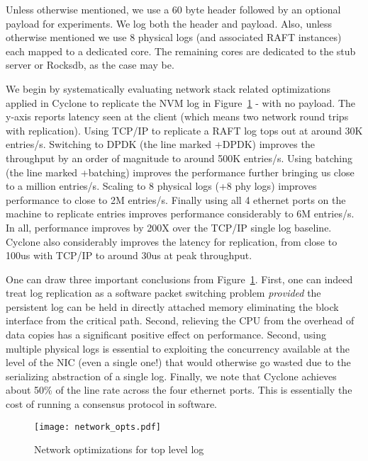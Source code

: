 \documentclass[twocolumn]{article}
\begin{document}
Unless otherwise mentioned, we use a 60 byte header followed by an optional
payload for experiments. We log both the header and payload. Also, unless
otherwise mentioned we use 8 physical logs (and associated RAFT instances) each
mapped to a dedicated core. The remaining cores are dedicated to the stub
server or Rocksdb, as the case may be.

We begin by systematically evaluating network stack related optimizations
applied in Cyclone to replicate the NVM log in Figure~\ref{fig:network_opts} -
with no payload. The y-axis reports latency seen at the client (which means two
network round trips with replication). Using TCP/IP to replicate a RAFT log tops
out at around 30K entries/s.  Switching to DPDK (the line marked +DPDK) improves
the throughput by an order of magnitude to around 500K entries/s. Using batching
(the line marked +batching) improves the performance further bringing us close
to a million entries/s. Scaling to 8 physical logs (+8 phy logs) improves
performance to close to 2M entries/s. Finally using all 4 ethernet ports on the
machine to replicate entries improves performance considerably to 6M
entries/s. In all, performance improves by 200X over the TCP/IP single log
baseline. Cyclone also considerably improves the latency for replication, from
close to 100us with TCP/IP to around 30us at peak throughput. 

One can draw three important conclusions from
Figure~\ref{fig:network_opts}. First, one can indeed treat log replication as a
software packet switching problem \emph{provided} the persistent log can be held
in directly attached memory eliminating the block interface from the critical
path. Second, relieving the CPU from the overhead of data copies has a
significant positive effect on performance. Second, using multiple physical
logs is essential to exploiting the concurrency available at the level of the
NIC (even a single one!) that would otherwise go wasted due
to the serializing abstraction of a single log. Finally, we note that Cyclone
achieves about 50\% of the line rate across the four ethernet
ports. This is essentially the cost of running a consensus protocol in
software.

\begin{figure}
\texttt{[image: network\_opts.pdf]}
\caption{Network optimizations for top level log}
\label{fig:network_opts}
\end{figure}
\end{document}
